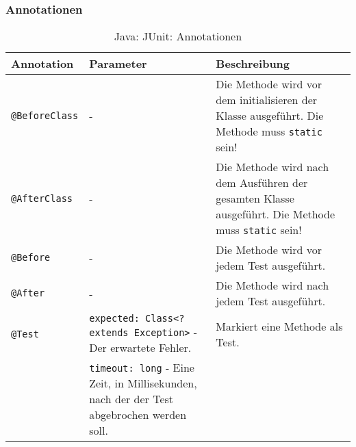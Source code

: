 \subsubsection{Annotationen}
\begin{sidewaystable}
	\centering
	\begin{tabular}{l | p{9cm} | p{10cm}}
		Annotation            & Parameter                                                                                        & Beschreibung                                                                                               \\
		\hline
		\texttt{@BeforeClass} & -                                                                                                & Die Methode wird vor dem initialisieren der Klasse ausgeführt. Die Methode muss \texttt{static} sein!      \\
		\texttt{@AfterClass}  & -                                                                                                & Die Methode wird nach dem Ausführen der gesamten Klasse ausgeführt. Die Methode muss \texttt{static} sein! \\
		\texttt{@Before}      & -                                                                                                & Die Methode wird vor jedem Test ausgeführt.                                                                \\
		\texttt{@After}       & -                                                                                                & Die Methode wird nach jedem Test ausgeführt.                                                               \\
		\texttt{@Test}        & \texttt{expected: Class<? extends Exception>} - Der erwartete Fehler.                            & Markiert eine Methode als Test.                                                                            \\
		                      & \texttt{timeout: long} - Eine Zeit, in Millisekunden, nach der der Test abgebrochen werden soll. &                                                                                                            \\
	\end{tabular}
	\caption{Java: JUnit: Annotationen}
\end{sidewaystable}


